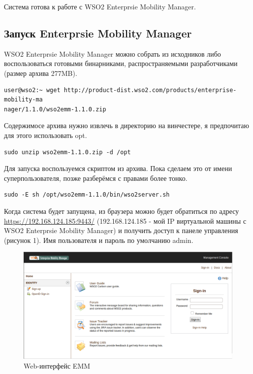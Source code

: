 \documentclass[a4paper, 12pt]{article}		%
\begin{document}
Система готова к работе с WSO2 Enterprsie Mobility Manager.

\subsection{Запуск Enterprsie Mobility Manager}

WSO2 Enterprsie Mobility Manager можно собрать из исходников либо воспользоваться готовыми бинарниками, распространяемыми разработчиками (размер архива 277MB).

\begin{Verbatim}[frame=single]
user@wso2:~ wget http://product-dist.wso2.com/products/enterprise-mobility-ma
nager/1.1.0/wso2emm-1.1.0.zip
\end{Verbatim}

Содержимосе архива нужно извлечь в директорию на винчестере, я предпочитаю для этого использовать opt.

\begin{Verbatim}[frame=single]
sudo unzip wso2emm-1.1.0.zip -d /opt
\end{Verbatim}

Для запуска воспользуемся скриптом из архива. Пока сделаем это от имени суперпользователя, позже разберёмся с правами более тонко.
\begin{Verbatim}[frame=single]
sudo -E sh /opt/wso2emm-1.1.0/bin/wso2server.sh
\end{Verbatim}

Когда система будет запущена, из браузера можно будет обратиться по адресу \url{https://192.168.124.185:9443/} (192.168.124.185 - мой IP виртуальной машины с WSO2 Enterprsie Mobility Manager) и получить доступ к панеле управления (рисунок 1). Имя пользователя и пароль по умолчанию admin.

\begin{figure}[h!]
\centering
\includegraphics[scale=0.45]{res/EMM001}
\caption{Web-интерфейс EMM}
\end{figure}
\end{document}
